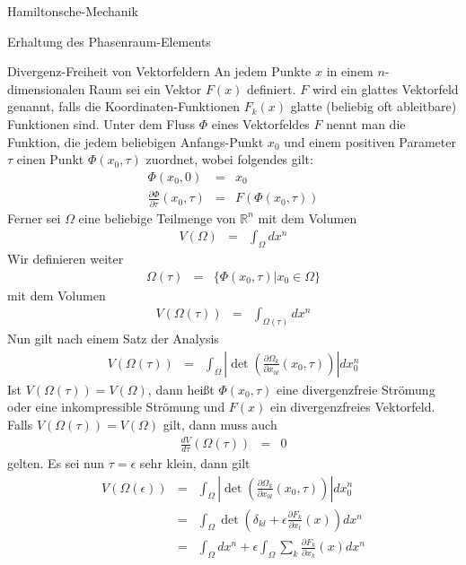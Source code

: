 \begin{chapter}{\titlestr}
\begin{section}{Hamiltonsche-Mechanik}
\begin{subsection}{Erhaltung des Phasenraum-Elements}
\begin{subsubsection}{Divergenz-Freiheit von Vektorfeldern}
An jedem Punkte $x$ in einem $n$-dimensionalen Raum sei ein Vektor $F(x)$ definiert. $F$ wird ein glattes Vektorfeld genannt, falls die Koordinaten-Funktionen $F_k(x)$ glatte (beliebig oft ableitbare) Funktionen sind.
Unter dem Fluss $\Phi$ eines Vektorfeldes $F$ nennt man die Funktion, die jedem beliebigen Anfangs-Punkt $x_0$ und einem positiven Parameter $\tau$ einen Punkt $\Phi(x_0,\tau)$ zuordnet, wobei folgendes gilt:
\begin{eqnarray*}
\Phi(x_0,0) &=& x_0\\
\frac{\partial \Phi}{\partial \tau}(x_0,\tau) &=& F\left(\Phi(x_0,\tau)\right)
\end{eqnarray*}
Ferner sei $\Omega$ eine beliebige Teilmenge von $\mathbb{R}^n$ mit dem Volumen
\begin{eqnarray*}
V(\Omega) &=& \int_\Omega dx^n
\end{eqnarray*}
Wir definieren weiter
\begin{eqnarray*}
\Omega(\tau) &=& \{ \Phi(x_0,\tau)|x_0 \in \Omega\}
\end{eqnarray*}
mit dem Volumen
\begin{eqnarray*}
V(\Omega(\tau)) &=& \int_{\Omega(\tau)} dx^n
\end{eqnarray*}
Nun gilt nach einem Satz der Analysis
\begin{eqnarray*}
V(\Omega(\tau)) &=& \int_{\Omega}\left|\det\left(\frac{\partial \Omega_k}{\partial x_{0l}}(x_0,\tau)\right)\right| dx_0^n
\end{eqnarray*}
Ist $V(\Omega(\tau)) = V(\Omega)$, dann heißt $\Phi(x_0,\tau)$ eine divergenzfreie Strömung oder eine inkompressible Strömung und $F(x)$ ein divergenzfreies Vektorfeld.
Falls $V(\Omega(\tau)) = V(\Omega)$ gilt, dann muss auch
\begin{eqnarray*}
\frac{d V}{d\tau}(\Omega(\tau)) &=& 0
\end{eqnarray*}
gelten. Es sei nun $\tau=\epsilon$ sehr klein, dann gilt
\begin{eqnarray*}
V(\Omega(\epsilon)) &=& \int_{\Omega}\left|\det\left(\frac{\partial \Omega_k}{\partial x_{0l}}(x_0,\tau)\right)\right| dx_0^n\\
&=& \int_{\Omega}\det\left(\delta_{kl}+\epsilon\frac{\partial F_k}{\partial x_l}(x)\right) dx^n\\
&=& \int_{\Omega}dx^n+ \epsilon\int_{\Omega}\sum_k\frac{\partial F_k}{\partial x_k}(x) dx^n\\

\end{eqnarray*}
\end{subsubsection}
\end{subsection}
\end{section}
\end{chapter}
